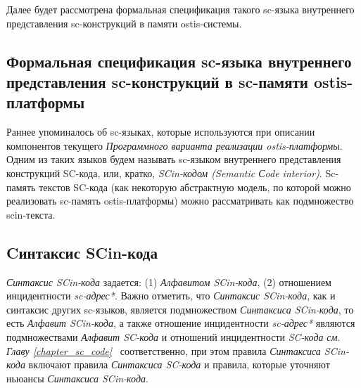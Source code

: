 Далее будет рассмотрена формальная спецификация такого sc-языка внутреннего представления sc-конструкций в памяти ostis-системы.

\subsection{Формальная спецификация sc-языка внутреннего представления sc-конструкций в sc-памяти ostis-платформы}
\label{sec_soft_platform_scin_code}

Раннее упоминалось об sc-языках, которые используются при описании компонентов текущего \textit{Программного варианта реализации ostis-платформы}. Одним из таких языков будем называть sc-языком внутреннего представления конструкций SC-кода, или, кратко, \textit{SCin-кодом (Semantic Сode interior)}. Sc-память текстов SC-кода (как некоторую абстрактную модель, по которой можно реализовать sc-память ostis-платформы) можно рассматривать как подмножество scin-текста.

\begin{SCn}
\begin{scnindent}
\end{scnindent}
\end{SCn}

\subsection{Cинтаксис SCin-кода}
\label{sec_soft_platform_scin_code_alphabet_and_syntax}

\textit{Синтаксис SCin-кода} задается: (1) \textit{Алфавитом SCin-кода}, (2) отношением инцидентности \textit{sc-адрес*}. Важно отметить, что \textit{Синтаксис SCin-кода}, как и синтаксис других sc-языков, является подмножеством \textit{Синтаксиса SCin-кода}, то есть \textit{Алфавит SCin-кода\scnsupergroupsign}, а также отношение инцидентности \textit{sc-адрес*} являются подмножествами \textit{Алфавит SC-кода\scnsupergroupsign} и отношений инцидентности \textit{SC-кода} \textit{см. Главу \ref{chapter_sc_code}~} соответственно, при этом правила \textit{Синтаксиса SCin-кода} включают правила \textit{Синтаксиса SC-кода} и правила, которые уточняют ньюансы \textit{Синтаксиса SCin-кода}.


